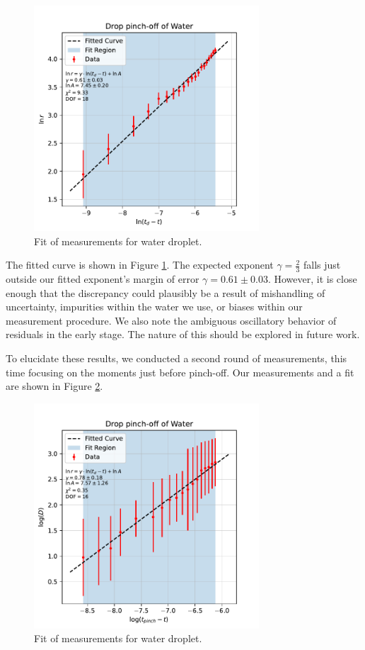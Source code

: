 \documentclass[12pt, letterpaper]{article}
\begin{document}
\begin{figure}[!h]
    \centering
    \includegraphics[width=0.75\textwidth]{experiment3/figures/plots/5waterfit.pdf}
    \caption{Fit of measurements for water droplet.}
    \label{fig:water-fit1}
\end{figure}

The fitted curve is shown in Figure \ref{fig:water-fit1}. The expected exponent $\gamma = \frac{2}{3}$ falls just outside our fitted exponent's margin of error $\gamma = 0.61 \pm 0.03$. However, it is close enough that the discrepancy could plausibly be a result of mishandling of uncertainty, impurities within the water we use, or biases within our measurement procedure. We also note the ambiguous oscillatory behavior of residuals in the early stage. The nature of this should be explored in future work. 

To elucidate these results, we conducted a second round of measurements, this time focusing on the moments just before pinch-off. Our measurements and a fit are shown in Figure \ref{fig:water-fit2}. 

\begin{figure}[!h]
    \centering
    \includegraphics[width=0.75\textwidth]{experiment3/figures/plots/4.pdf}
    \caption{Fit of measurements for water droplet.}
    \label{fig:water-fit2}
\end{figure}
\end{document}
